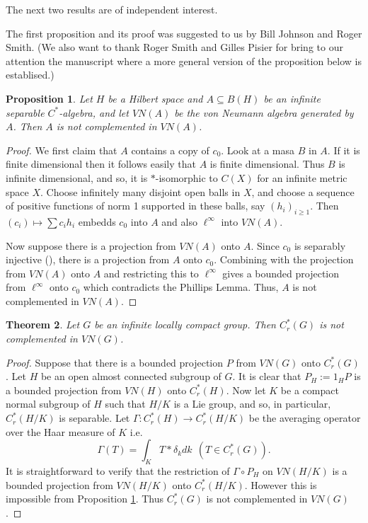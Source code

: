 \documentclass[10pt]{amsart}
\newtheorem{thm}{Theorem}
\newtheorem{prop}[thm]{Proposition}
\numberwithin{thm}{section}
\numberwithin{equation}{section}
\begin{document}
The next two results are of independent interest.

The first proposition and its proof was suggested to us by Bill Johnson and Roger Smith. (We also want to thank Roger Smith and 
Gilles Pisier for bring to our attention the manuscript \cite{ABU} where a more general version of 
the proposition below is establised.) 

\begin{prop}\label{P:com-A-VN(A)}
Let $H$ be a Hilbert space and $A \subseteq B(H)$ be an infinite separable $C^*$-algebra, and let $VN(A)$ be the
von Neumann algebra generated by $A$. Then $A$ is not complemented in $VN(A)$.
\end{prop}

\begin{proof}
We first claim that $A$ contains a copy of $c_0$. Look at a masa $B$ in $A$.
If it is finite dimensional then it follows easily that $A$ is finite dimensional.
Thus $B$ is infinite dimensional, and so, it is $*$-isomorphic to $C(X)$ for an infinite metric space $X$.
Choose infinitely many disjoint open balls in $X$, and choose a sequence of positive functions of norm 1 supported in these balls,
say $(h_i)_{i\ge 1}$. Then $(c_i) \mapsto \sum c_ih_i$ embedds $c_0$ into $A$ and also $\ell^{\infty}$ into $VN(A)$.

Now suppose there is a projection from $VN(A)$ onto $A$. Since $c_0$ is separably injective (\cite{So62}), there is a projection from $A$ onto $c_0$.
Combining with the projection from $VN(A)$ onto $A$ and restricting this to $\ell^{\infty}$
gives a bounded projection from $\ell^{\infty}$ onto $c_0$ which contradicts the Phillips Lemma. Thus, $A$ is not complemented in $VN(A)$.
\end{proof}

\begin{thm}\label{thm-non-complemented}
Let $G$ be an infinite locally compact group. Then $C^*_r(G)$ is not complemented in $VN(G)$.
\end{thm}

\begin{proof}
Suppose that there is a bounded projection $P$ from $VN(G)$ onto $C^*_r(G)$.
Let $H$ be an open almost connected subgroup of $G$. It is clear that
$P_H:=1_HP$ is a bounded projection from $VN(H)$ onto $C^*_r(H)$. Now let $K$
be a compact normal subgroup of $H$ such that $H/K$ is a Lie group, and so, in particular,
$C_r^*(H/K)$ is separable. Let $\Gamma : C_r^*(H) \to C_r^*(H/K)$ be the averaging operator over
the Haar measure of $K$ i.e. 
	$$\Gamma(T)=\int_K T*\delta_k dk \ \ (T\in C_r^*(G)).$$
It is straightforward to verify that the restriction of $\Gamma\circ P_H$ on
$VN(H/K)$ is a bounded projection from $VN(H/K)$ onto $C_r^*(H/K)$. However this is
impossible from Proposition \ref{P:com-A-VN(A)}. Thus $C_r^*(G)$ is not complemented in $VN(G)$. 
\end{proof}
\end{document}
